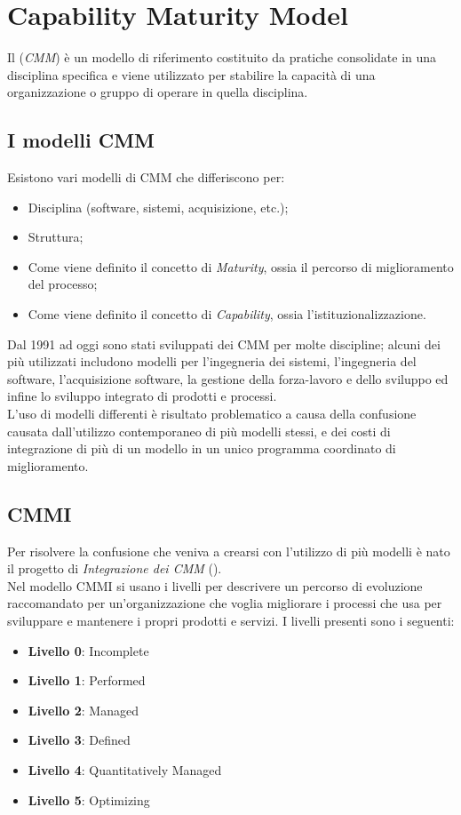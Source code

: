 \section{Capability Maturity Model}
Il  (\textit{CMM}) è un modello di riferimento costituito
da pratiche consolidate in una disciplina specifica e viene utilizzato per stabilire la
capacità di una organizzazione o gruppo di operare in quella disciplina.

\subsection{I modelli CMM}
Esistono vari modelli di CMM che differiscono per:

\begin{itemize}
	\item Disciplina (software, sistemi, acquisizione, etc.);
	\item Struttura;
	\item Come viene definito il concetto di \textit{Maturity}, ossia il percorso di miglioramento del processo;
	\item Come viene definito il concetto di \textit{Capability}, ossia l'istituzionalizzazione.
\end{itemize}
Dal 1991 ad oggi sono stati sviluppati dei CMM per molte discipline; alcuni dei
più utilizzati includono modelli per l'ingegneria dei sistemi, l'ingegneria del software, l'acquisizione software, la gestione della forza-lavoro e dello sviluppo ed infine lo sviluppo
integrato di prodotti e processi. \\
L'uso di modelli differenti è risultato problematico a causa della confusione causata dall'utilizzo contemporaneo di più modelli stessi, e dei costi di integrazione di più di un modello in un unico programma coordinato di miglioramento.

\subsection{CMMI}
Per risolvere la confusione che veniva a crearsi con l'utilizzo di più modelli è nato
il progetto di \textit{Integrazione dei CMM} (). \\
Nel modello CMMI si usano i livelli per descrivere un percorso di evoluzione raccomandato per un'organizzazione che voglia migliorare i processi che usa per sviluppare e mantenere i propri prodotti e servizi. I livelli presenti sono i seguenti:
\begin{itemize}
	\item \textbf{Livello 0}: Incomplete
	\item \textbf{Livello 1}: Performed
	\item \textbf{Livello 2}: Managed
	\item \textbf{Livello 3}: Defined
	\item \textbf{Livello 4}: Quantitatively Managed
	\item \textbf{Livello 5}: Optimizing
\end{itemize}

